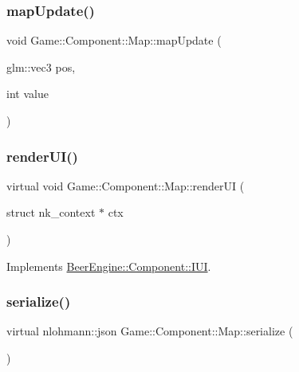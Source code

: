 \subsubsection{\texorpdfstring{map\+Update()}{mapUpdate()}\hspace{0.1cm}{\footnotesize\ttfamily [2/2]}}
{\footnotesize\ttfamily void Game\+::\+Component\+::\+Map\+::map\+Update (\begin{DoxyParamCaption}\item[{glm\+::vec3}]{pos,  }\item[{int}]{value }\end{DoxyParamCaption})}

\mbox{\label{class_game_1_1_component_1_1_map_af062dd2c3e677c1d3d9204cac8508dde}} 
\subsubsection{\texorpdfstring{render\+U\+I()}{renderUI()}}
{\footnotesize\ttfamily virtual void Game\+::\+Component\+::\+Map\+::render\+UI (\begin{DoxyParamCaption}\item[{struct nk\+\_\+context $\ast$}]{ctx }\end{DoxyParamCaption})\hspace{0.3cm}{\ttfamily [virtual]}}



Implements \mbox{\hyperlink{class_beer_engine_1_1_component_1_1_i_u_i_a4a049b1749c1bce80e1fd63538e9fae3}{Beer\+Engine\+::\+Component\+::\+I\+UI}}.

\mbox{\label{class_game_1_1_component_1_1_map_a220f971266cc2b3c5f7b6a10639ec8e6}} 
\subsubsection{\texorpdfstring{serialize()}{serialize()}}
{\footnotesize\ttfamily virtual nlohmann\+::json Game\+::\+Component\+::\+Map\+::serialize (\begin{DoxyParamCaption}{ }\end{DoxyParamCaption})\hspace{0.3cm}{\ttfamily [virtual]}}



